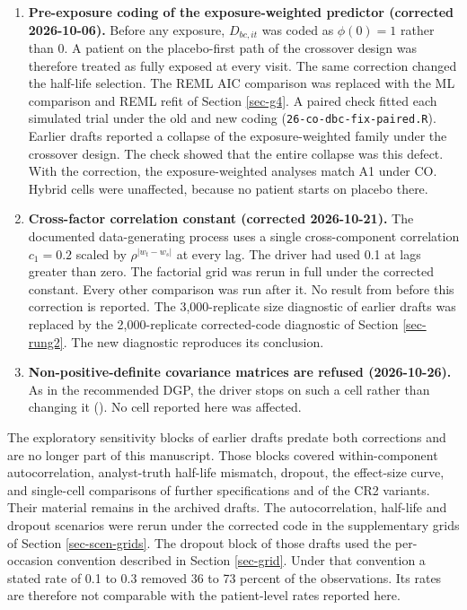 \documentclass[
  11pt,
]{article}
\providecommand{\tightlist}{%
  \setlength{\itemsep}{0pt}\setlength{\parskip}{0pt}}
\begin{document}
\begin{enumerate}
\def\labelenumi{\arabic{enumi}.}
\tightlist
\item
  \textbf{Pre-exposure coding of the exposure-weighted predictor
  (corrected 2026-10-06).} Before any exposure, \(D_{bc,it}\) was
  coded as \(\phi(0) = 1\) rather than 0. A patient on the
  placebo-first path of the crossover design was therefore treated
  as fully exposed at every visit. The same correction changed the
  half-life selection. The REML AIC comparison was replaced with the
  ML comparison and REML refit of Section \ref{sec-g4}. A paired
  check fitted each simulated trial under the old and new coding
  (\texttt{26-co-dbc-fix-paired.R}). Earlier drafts reported a collapse of
  the exposure-weighted family under the crossover design. The check
  showed that the entire collapse was this defect. With the
  correction, the exposure-weighted analyses match A1 under CO.
  Hybrid cells were unaffected, because no patient starts on placebo
  there.
\item
  \textbf{Cross-factor correlation constant (corrected 2026-10-21).} The
  documented data-generating process uses a single cross-component
  correlation \(c_1 = 0.2\) scaled by \(\rho^{|w_t - w_s|}\) at every
  lag. The driver had used 0.1 at lags greater than zero. The
  factorial grid was rerun in full under the corrected constant.
  Every other comparison was run after it. No result from before
  this correction is reported. The 3,000-replicate size diagnostic
  of earlier drafts was replaced by the 2,000-replicate
  corrected-code diagnostic of Section \ref{sec-rung2}. The new
  diagnostic reproduces its conclusion.
\item
  \textbf{Non-positive-definite covariance matrices are refused
  (2026-10-26).} As in the recommended DGP, the driver stops on such
  a cell rather than changing it
  (). No cell reported here was
  affected.
\end{enumerate}

The exploratory sensitivity blocks of earlier drafts predate both
corrections and are no longer part of this manuscript. Those blocks
covered within-component autocorrelation, analyst-truth half-life
mismatch, dropout, the effect-size curve, and single-cell
comparisons of further specifications and of the CR2 variants. Their
material remains in the archived drafts. The autocorrelation,
half-life and dropout scenarios were rerun under the corrected code
in the supplementary grids of Section \ref{sec-scen-grids}. The
dropout block of those drafts used the per-occasion convention
described in Section \ref{sec-grid}. Under that convention a stated
rate of 0.1 to 0.3 removed 36 to 73 percent of the observations. Its
rates are therefore not comparable
with the patient-level rates reported here.
\end{document}
